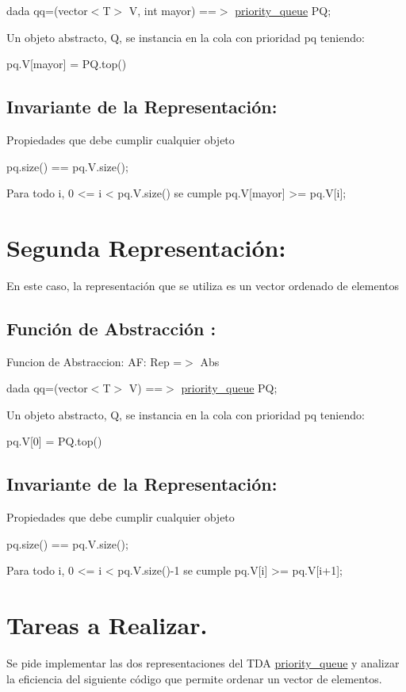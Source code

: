 dada qq=(vector$<$\-T$>$ \-V, int mayor) ==$>$ \hyperlink{classpriority__queue}{priority\-\_\-queue} \-P\-Q;

\-Un objeto abstracto, \-Q, se instancia en la cola con prioridad pq teniendo\-:


\begin{DoxyCode}
 pq.V[mayor] = PQ.top()
\end{DoxyCode}
\hypertarget{index_inv_sec1}{}\subsection{\-Invariante de la Representación\-:}\label{index_inv_sec1}
\-Propiedades que debe cumplir cualquier objeto


\begin{DoxyCode}
pq.size() == pq.V.size();

Para todo i, 0 <= i < pq.V.size() se cumple
pq.V[mayor] >= pq.V[i];
\end{DoxyCode}
\hypertarget{index_segunda}{}\section{\-Segunda Representación\-:}\label{index_segunda}
\-En este caso, la representación que se utiliza es un vector ordenado de elementos \hypertarget{index_fact_sec2}{}\subsection{\-Función de Abstracción \-:}\label{index_fact_sec2}
\-Funcion de \-Abstraccion\-: \-A\-F\-: \-Rep =$>$ \-Abs

dada qq=(vector$<$\-T$>$ \-V) ==$>$ \hyperlink{classpriority__queue}{priority\-\_\-queue} \-P\-Q;

\-Un objeto abstracto, \-Q, se instancia en la cola con prioridad pq teniendo\-:


\begin{DoxyCode}
 pq.V[0] = PQ.top()
\end{DoxyCode}
\hypertarget{index_inv_sec2}{}\subsection{\-Invariante de la Representación\-:}\label{index_inv_sec2}
\-Propiedades que debe cumplir cualquier objeto


\begin{DoxyCode}
pq.size() == pq.V.size();

Para todo i, 0 <= i < pq.V.size()-1 se cumple
pq.V[i] >= pq.V[i+1];
\end{DoxyCode}
 \hypertarget{index_sec_tar}{}\section{\-Tareas a Realizar.}\label{index_sec_tar}
\-Se pide implementar las dos representaciones del \-T\-D\-A \hyperlink{classpriority__queue}{priority\-\_\-queue} y analizar la eficiencia del siguiente código que permite ordenar un vector de elementos.

